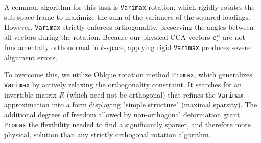 \begin{subappendices}
A common algorithm for this task is \texttt{Varimax} rotation, which rigidly rotates the sub-space frame to maximize the sum of the variances of the squared loadings. However, \texttt{Varimax} strictly enforces orthogonality, preserving the angles between all vectors during the rotation. Because our physical CCA vectors $\boldsymbol{c}^R_i$ are not fundamentally orthonormal in $k$-space, applying rigid \texttt{Varimax} produces severe alignment errors.

To overcome this, we utilize Oblque rotation method \texttt{Promax}, which generalizes \texttt{Varimax} by actively relaxing the orthogonality constraint. It searches for an invertible matrix $R$ (which need not be orthogonal) that refines the \texttt{Varimax} approximation into a form displaying "simple structure" (maximal sparsity). The additional degrees of freedom allowed by non-orthogonal deformation grant \texttt{Promax} the flexibility needed to find a significantly sparser, and therefore more physical, solution than any strictly orthogonal rotation algorithm. 


\end{subappendices}
